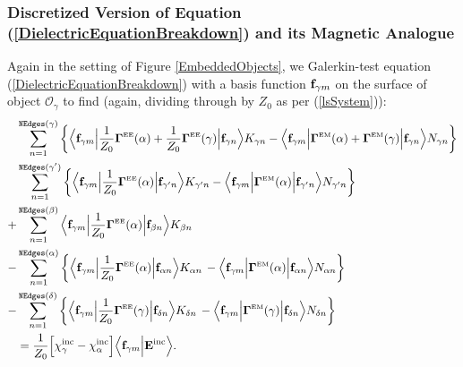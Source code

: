 \documentclass[letterpaper]{article}
\begin{document}
\subsubsection*{Discretized Version of Equation
                (\ref{DielectricEquationBreakdown}) and its 
                Magnetic Analogue}

Again in the setting of Figure \ref{EmbeddedObjects}, we 
Galerkin-test equation (\ref{DielectricEquationBreakdown}) 
with a basis function $\mathbf{f}_{\gamma m}$ on the surface
of object $\mathcal{O}_\gamma$ to find (again, dividing through
by $Z_0$ as per (\ref{lsSystem})):
\begin{subequations}
\begin{align}
&\sum_{n=1}^{\texttt{NEdges}(\gamma)}  \bigg\{
   \Big\langle 
         \mathbf{f}_{\gamma m} 
   \Big| \frac{1}{Z_0} \boldsymbol{\Gamma}^{\hbox{\tiny{EE}}}(\alpha) + \frac{1}{Z_0} \boldsymbol{\Gamma}^{\hbox{\tiny{EE}}}(\gamma) \Big|
         \mathbf{f}_{\gamma n}
   \Big\rangle 
         K_{\gamma n}
   -
   \Big\langle 
         \mathbf{f}_{\gamma m} 
   \Big| \boldsymbol{\Gamma}^{\hbox{\tiny{EM}}}(\alpha) + \boldsymbol{\Gamma}^{\hbox{\tiny{EM}}}(\gamma) \Big|
         \mathbf{f}_{\gamma n}
   \Big\rangle 
         N_{\gamma n}
  \bigg\}
\nonumber \\
&\sum_{n=1}^{\texttt{NEdges}(\gamma^\prime)}  \bigg\{
   \Big\langle 
         \mathbf{f}_{\gamma m} 
   \Big| \frac{1}{Z_0}\boldsymbol{\Gamma}^{\hbox{\tiny{EE}}}(\alpha) \Big|
         \mathbf{f}_{\gamma^\prime n}
   \Big\rangle 
         K_{\gamma^\prime n}
   -
   \Big\langle 
         \mathbf{f}_{\gamma m} 
   \Big| \boldsymbol{\Gamma}^{\hbox{\tiny{EM}}}(\alpha) \Big|
         \mathbf{f}_{\gamma^\prime n}
   \Big\rangle 
         N_{\gamma^\prime n}
  \bigg\}
\nonumber \\
+&\sum_{n=1}^{\texttt{NEdges}(\beta)} 
   \Big\langle 
         \mathbf{f}_{\gamma m} 
   \Big| \frac{1}{Z_0} \boldsymbol{\Gamma}^{\hbox{\tiny{EE}}}(\alpha) \Big| 
         \mathbf{f}_{\beta n}
   \Big\rangle 
         K_{\beta n}
\nonumber \\
-&\sum_{n=1}^{\texttt{NEdges}(\alpha)} \bigg\{
   \Big\langle 
         \mathbf{f}_{\gamma m} 
   \Big| \frac{1}{Z_0} \boldsymbol{\Gamma}^{\hbox{\tiny{EE}}}(\alpha) \Big| 
         \mathbf{f}_{\alpha n}
   \Big\rangle 
         K_{\alpha n}
   \,-
   \Big\langle 
         \mathbf{f}_{\gamma m} 
   \Big| \boldsymbol{\Gamma}^{\hbox{\tiny{EM}}}(\alpha) \Big| 
         \mathbf{f}_{\alpha n}
   \Big\rangle 
         N_{\alpha n}
  \bigg\}
\nonumber \\
-&\sum_{n=1}^{\texttt{NEdges}(\delta)} \bigg\{
   \Big\langle 
         \mathbf{f}_{\gamma m} 
   \Big| \frac{1}{Z_0} \boldsymbol{\Gamma}^{\hbox{\tiny{EE}}}(\gamma) \Big| 
         \mathbf{f}_{\delta n}
   \Big\rangle 
         K_{\delta n}
   \,-
   \Big\langle 
         \mathbf{f}_{\gamma m} 
   \Big| \boldsymbol{\Gamma}^{\hbox{\tiny{EM}}}(\gamma) \Big| 
         \mathbf{f}_{\delta n}
   \Big\rangle 
         N_{\delta n}
  \bigg\}
\nonumber \\
&=\frac{1}{Z_0} \Big[\chi_\gamma^{\hbox{\scriptsize{inc}}} - \chi_\alpha^{\hbox{\scriptsize{inc}}}\Big] 
   \Big\langle \mathbf{f}_{\gamma m} \Big| \mathbf{E}^{\hbox{\scriptsize{inc}}} \Big\rangle.
\end{align}


\end{subequations}
\end{document}
